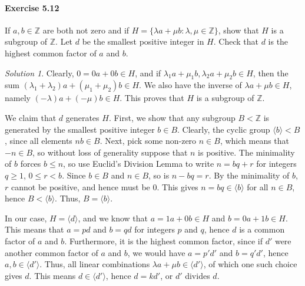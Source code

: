 \documentclass[11pt]{report}
\def\Z{\mathbb{Z}}
\theoremstyle{remark}
\newtheorem*{solution}{Solution}
\begin{document}
    \paragraph{Exercise 5.12} If $a, b \in \Z$ are both not zero and if $H =
    \{\lambda a + \mu b : \lambda, \mu \in \Z\}$, show that $H$ is a subgroup of
    $\Z$. Let $d$ be the smallest positive integer in $H$. Check that $d$ is the
    highest common factor of $a$ and $b$.
    \begin{solution}
        Clearly, $0 = 0a + 0b \in H$, and if $\lambda_1 a + \mu_1 b, \lambda_2 a +
        \mu_2 b \in H$, then the sum $(\lambda_1 + \lambda_2)a + (\mu_1 + \mu_2)b
        \in H$. We also have the inverse of $\lambda a + \mu b \in H$, namely
        $(-\lambda)a + (-\mu)b \in H$. This proves that $H$ is a subgroup of $\Z$.

        We claim that $d$ generates $H$. First, we show that any subgroup $B < \Z$ is
        generated by the smallest positive integer $b \in B$. Clearly, the cyclic
        group $\langle b\rangle < B$, since all elements $nb \in B$. Next, pick some
        non-zero $n \in B$, which means that $-n \in B$, so without loss of
        generality suppose that $n$ is positive. The minimality of $b$ forces $b
        \leq n$, so use Euclid's Division Lemma to write $n = bq + r$ for integers
        $q \geq 1$, $0 \leq r < b$. Since $b \in B$ and $n \in B$, so is $n - bq =
        r$. By the minimality of $b$, $r$ cannot be positive, and hence must be $0$.
        This gives $n = bq \in \langle b\rangle$ for all $n \in B$, hence $B <
        \langle b\rangle$. Thus, $B = \langle b \rangle$.

        In our case, $H = \langle d\rangle$, and we know that $a = 1a + 0b \in H$
        and $b = 0a + 1b \in H$. This means that $a = pd$ and $b = qd$ for integers
        $p$ and $q$, hence $d$ is a common factor of $a$ and $b$. Furthermore, it is
        the highest common factor, since if $d'$ were another common factor of $a$ and
        $b$, we would have $a = p'd'$ and $b = q'd'$, hence $a, b \in \langle
        d'\rangle$. Thus, all linear combinations $\lambda a + \mu b \in \langle
        d'\rangle$, of which one such choice gives $d$. This means $d \in \langle
        d'\rangle$, hence $d = kd'$, or $d'$ divides $d$.
    \end{solution}
    
\end{document}
